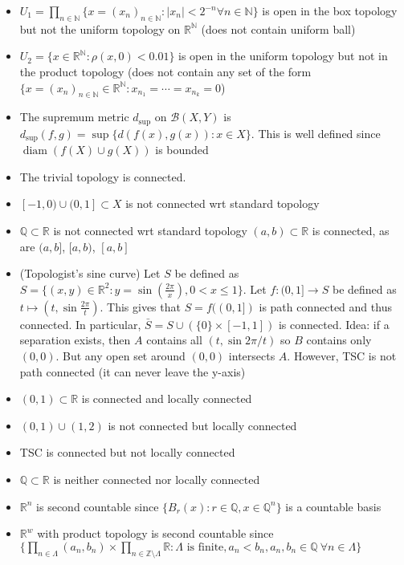 \documentclass[frenchspacing,9pt,landscape,a4paper]{article}
\newcommand{\BR}{\mathbb R}
\newcommand{\BQ}{\mathbb Q}
\newcommand{\BZ}{\mathbb Z}
\newcommand{\BN}{\mathbb N}
\newcommand{\abs}[1]{\left\lvert #1 \right\rvert}
\DeclareMathOperator{\diam}{diam}
\theoremstyle{remark}
\begin{document}
\begin{multicols}{4}
\begin{itemize}
\item $U_1=\prod_{n\in\BN}\{x=(x_n)_{n\in\BN}:\abs{x_n}<2^{-n}\forall n\in\BN\}$ is open in the box
    topology but not the uniform topology on $\BR^\BN$ (does not contain uniform ball)
\item $U_2=\{x\in\BR^\BN:\rho(x,0)<0.01\}$ is open in the uniform topology but not in the product topology
    (does not contain any set of the form $\{x=(x_n)_{n\in\BN}\in\BR^\BN:x_{n_1}=\cdots=x_{n_k}=0$)
    \item The supremum metric $d_{\sup}$ on  $\mathcal{B}(X,Y)$ is
        $d_{\sup} (f,g)={\sup}\{d(f(x),g(x)):x\in X\}$. This is well defined since $\diam(f(X)\cup g(X))$ is
        bounded
    \item The trivial topology is connected. 
    \item $[-1,0)\cup(0,1]\subset X$ is not connected wrt standard topology
    \item  $\BQ\subset\BR$ is not connected wrt standard topology
        $(a,b)\subset\BR$ is connected, as are  $(a,b]$,  $[a,b)$,  $[a,b]$
    \item (Topologist's sine curve) Let $S$ be defined as $S = \{(x,y) \in \mathbb{R}^2 : y =
        \sin(\frac{2\pi}{x}), 0 < x \leq 1\}$.
Let $f: (0,1] \to S$ be defined as $t \mapsto (t, \sin\frac{2\pi}{t})$. This gives that $S = f((0,1])$ is
path connected and thus connected. In particular, $\bar{S} = S \cup (\{0\} \times [-1,1])$ is connected.
Idea: if a separation exists, then $A$ contains all  $(t,\sin 2\pi /t)$ so $B$ contains only  $(0,0)$. But
any open set around  $(0,0)$ intersects  $A$. However, TSC is not path connected (it can never leave the
y-axis)
\item $(0,1)\subset\BR$ is connected and locally connected
\item $(0,1)\cup(1,2)$ is not connected but locally connected
\item TSC is connected but not locally connected
\item $\BQ\subset\BR$ is neither connected nor locally connected    
\item $\BR^n$ is second countable since  $\{B_r(x):r\in\BQ,x\in\BQ^n\}$ is a countable basis
\item $\BR^w$ with product topology is second countable since
    $\{\prod_{n\in\Lambda}(a_n,b_n)\times\prod_{n\in\BZ\setminus\Lambda}\BR:\Lambda\text{ is
    finite},a_n<b_n,a_n,b_n\in\BQ\ \forall n\in\Lambda\}$    
\end{itemize}


\end{multicols}
\end{document}
